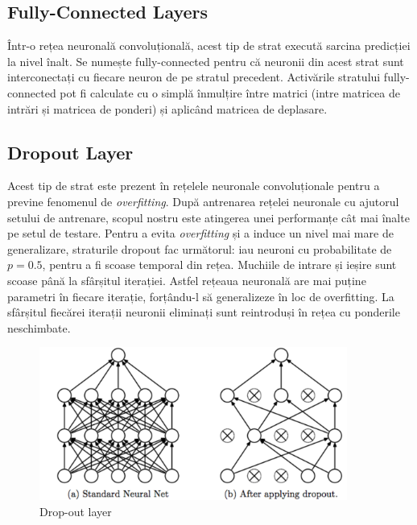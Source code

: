 \subsection{Fully-Connected Layers}
Într-o rețea neuronală convoluțională, acest tip de strat execută sarcina predicției la nivel înalt. Se numește fully-connected pentru că neuronii din acest strat sunt interconectați cu fiecare neuron de pe stratul precedent.\newline
Activările stratului fully-connected pot fi calculate cu o simplă înmulțire între matrici (intre matricea de intrări și matricea de ponderi) și aplicând matricea de deplasare.

\subsection{Dropout Layer}
Acest tip de strat este prezent în rețelele neuronale convoluționale pentru a previne fenomenul de \textit{overfitting}. După antrenarea rețelei neuronale cu ajutorul setului de antrenare, scopul nostru este atingerea unei performanțe cât mai înalte pe setul de testare. Pentru a evita \textit{overfitting} și a induce un nivel mai mare de generalizare, straturile dropout fac următorul: iau neuroni cu probabilitate de $p=0.5$, pentru a fi scoase temporal din rețea. Muchiile de intrare și ieșire sunt scoase până la sfârșitul iterației.\newline
Astfel rețeaua neuronală are mai puține parametri în fiecare iterație, forțându-l să generalizeze în loc de overfitting. La sfârșitul fiecărei iterații neuronii eliminați sunt reintroduși în rețea cu ponderile neschimbate.

\begin{figure}[h!]
    	\centering
	\captionsetup{justification=centering, margin=2cm}
	\includegraphics[width=0.9\textwidth]{figures/dro_out_lay.png}
	\caption{Drop-out layer \cite{dro_out_lay}}
	\label{fig:drop-out layer}
\end{figure}

